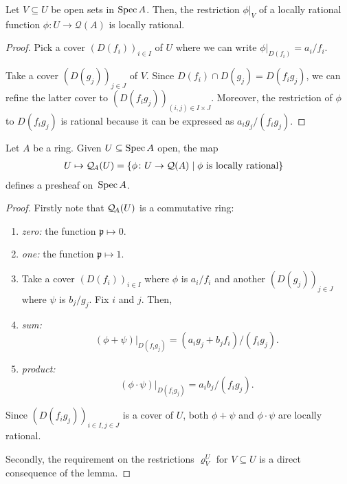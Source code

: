 \begin{lem}
    Let\/ $V\subseteq U$ be open sets in\/ $\operatorname{Spec} A$. Then, the restriction\/ $\phi|_V$ of a locally rational function\/ $\phi\colon U\to\mathcal Q(A)$ is locally rational.
\end{lem}

\begin{proof}
    Pick a cover $(D(f_i))_{i\in I}$ of $U$ where we can write $\phi|_{D(f_i)}=a_i/f_i$. 
    
    Take a cover $(D(g_j))_{j\in J}$ of $V$. Since $D(f_i)\cap D(g_j)=D(f_ig_j)$, we can refine the latter cover to $(D(f_ig_j))_{(i,j)\in I\times J}$. Moreover, the restriction of $\phi$ to $D(f_ig_j)$ is rational because it can be expressed as $a_ig_j/(f_ig_j)$. 
\end{proof}

\begin{thm}
    Let\/ $A$ be a ring. Given\/ $U\subseteq\operatorname{Spec} A$ open, the map
    \begin{align*}
        U\mapsto\mathcal Q_{\!A}(U) &= \{\phi\colon U\to\mathcal Q(A)
            \mid \phi\text{\rm\ is locally rational}\}
    \end{align*}
    defines a presheaf on\/~$\operatorname{Spec} A$.
\end{thm}

\begin{proof}
    Firstly note that $\mathcal Q_{\!A}(U)$ is a commutative ring:
    \begin{enumerate}[-]
        \item \textit{zero:} the function $\mathfrak p\mapsto 0$.
        \item \textit{one:} the function $\mathfrak p\mapsto 1$.
        \item[]Take a cover $(D(f_i))_{i\in I}$ where $\phi$ is $a_i/f_i$ and another $(D(g_j))_{j\in J}$ where $\psi$ is $b_j/g_j$. Fix $i$ and $j$. Then, 
        \item \textit{sum:} 
        $$
            (\phi+\psi)|_{D(f_ig_j)}
                = (a_ig_j+b_jf_i)
                /(f_ig_j).
        $$
        \item \textit{product:}
        $$
            (\phi\cdot\psi)|_{D(f_ig_j)}
                = a_ib_j/(f_ig_j).
        $$
    \end{enumerate}
    Since $(D(f_ig_j))_{i\in I,j\in J}$ is a cover of $U$, both $\phi+\psi$ and $\phi\cdot\psi$ are locally rational.
    
    Secondly, the requirement on the restrictions $\varrho^U_V$ for $V\subseteq U$ is a direct consequence of the lemma.
\end{proof}

